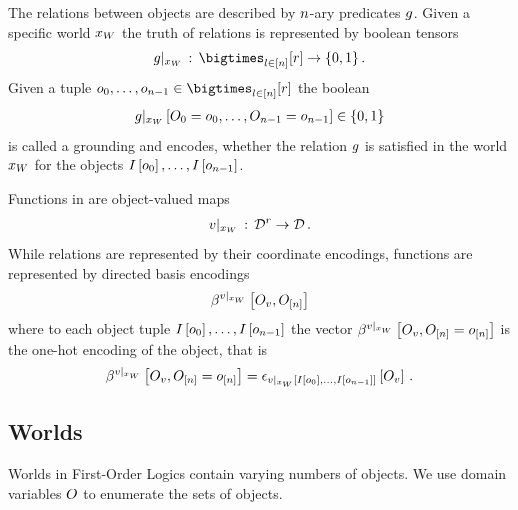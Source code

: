 The relations between objects are described by $n$-ary predicates $g$.
Given a specific world $x_{W}$ the truth of relations is represented by boolean tensors
\begin{align*}
    \groundingof{\folpredicate} \defcols \symindstates\rightarrow\ozset \, .
\end{align*}
Given a tuple $\indindexlist\in\symindstates$ the boolean
\begin{align*}
    {g}|_{x_{W}} \left[O_{0}=o_{0},\ldots,O_{n-1}=o_{n-1}\right] \in\{0,1\}
\end{align*}
is called a grounding and encodes, whether the relation $g$ is satisfied in the world $x_{W}$ for the objects $I\left[o_{0}\right],\ldots,I\left[o_{n-1}\right]$.

Functions in \firstOrderLogic{} are object-valued maps
\begin{align*}
    {v}|_{x_{W}}\,:\, \mathcal{D}^{r} \rightarrow \mathcal{D} \, .
\end{align*}
While relations are represented by their coordinate encodings, functions are represented by directed basis encodings
\begin{align*}
    \bencodingofat{\groundingof{\folfunction}}{\indvariableof{\folfunction},\shortindvariables}
\end{align*}
where to each object tuple $I\left[o_{0}\right],\ldots,I\left[o_{n-1}\right]$ the vector $\bencodingofat{\groundingof{\folfunction}}{\indvariableof{\folfunction},\indexedshortindvariables}$ is the one-hot encoding of the object, that is
\begin{align*}
    \bencodingofat{\groundingof{\folfunction}}{\indvariableof{\folfunction},\indexedshortindvariables}
    = \onehotmapofat{\groundingofat{\folfunction}{\indexinterpretationat{\indindexof{0}},\ldots,\indexinterpretationat{\indindexof{\indorder-1}}}}{\indvariableof{\folfunction}} \, .
\end{align*}



\subsection{Worlds}

Worlds in First-Order Logics contain varying numbers of objects.
We use domain variables $O$ to enumerate the sets of objects.


